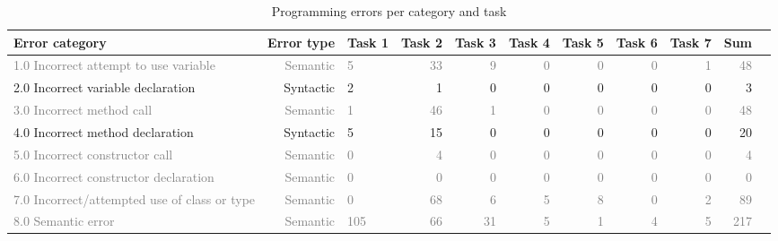 \begin{table*}[!ht]
 \caption{Programming errors per category and task}
    \centering
    \begin{tabular}{lrlrrrrrrrr}
        \toprule
        \textbf{Error category} & \textbf{Error type} & \textbf{Task 1} & \textbf{Task 2}  & \textbf{Task 3} & \textbf{Task 4} & \textbf{Task 5} & \textbf{Task 6} & \textbf{Task 7}  & \textbf{Sum} \\
        \midrule
            \textcolor{gray}{1.0 Incorrect attempt to use variable} & \textcolor{gray}{Semantic} & 
            \textcolor{gray}{5} & \textcolor{gray}{33} & \textcolor{gray}{9} & \textcolor{gray}{0} & \textcolor{gray}{0} & \textcolor{gray}{0} & \textcolor{gray}{1} & \textcolor{gray}{48} \\
            2.0 Incorrect variable declaration & Syntactic &
            2 & 1 & 0 & 0 & 0 & 0 & 0 & 3 \\ 
            \textcolor{gray}{3.0 Incorrect method call} & \textcolor{gray}{Semantic} &
            \textcolor{gray}{1} & \textcolor{gray}{46} & \textcolor{gray}{1} & \textcolor{gray}{0} & \textcolor{gray}{0} & \textcolor{gray}{0} & \textcolor{gray}{0} & \textcolor{gray}{48} \\ 
            4.0 Incorrect method declaration & Syntactic & 
            5 & 15 & 0 & 0 & 0 & 0 & 0 & 20 \\ 
            \textcolor{gray}{5.0 Incorrect constructor call} & \textcolor{gray}{Semantic} &
            \textcolor{gray}{0} & \textcolor{gray}{4} & \textcolor{gray}{0} & \textcolor{gray}{0} & \textcolor{gray}{0} & \textcolor{gray}{0} & \textcolor{gray}{0} & \textcolor{gray}{4} \\ 
            \textcolor{gray}{6.0 Incorrect constructor declaration} & \textcolor{gray}{Semantic} & \textcolor{gray}{0} & \textcolor{gray}{0} & \textcolor{gray}{0} & \textcolor{gray}{0} & \textcolor{gray}{0} & \textcolor{gray}{0} & \textcolor{gray}{0} & \textcolor{gray}{0} \\
            \textcolor{gray}{7.0 Incorrect/attempted use of class or type} & \textcolor{gray}{Semantic} & 
            \textcolor{gray}{0} & \textcolor{gray}{68} & \textcolor{gray}{6} & \textcolor{gray}{5} & \textcolor{gray}{8} & \textcolor{gray}{0} & \textcolor{gray}{2} & \textcolor{gray}{89} \\ 
            \textcolor{gray}{8.0 Semantic error} & \textcolor{gray}{Semantic} & \textcolor{gray}{105} & \textcolor{gray}{66} & \textcolor{gray}{31} & \textcolor{gray}{5} & \textcolor{gray}{1} & \textcolor{gray}{4} & \textcolor{gray}{5} & \textcolor{gray}{217} \\ 

\end{tabular}
\end{table*}

